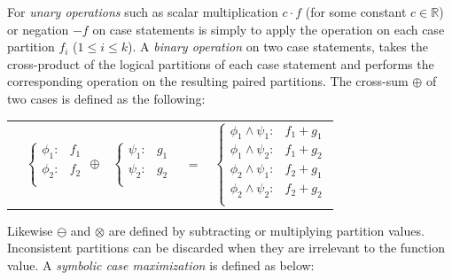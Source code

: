 \documentclass{article} %
\begin{document}
For \emph{unary operations} such as scalar multiplication $c\cdot f$ (for some constant $c \in \mathbb{R}$) or negation $-f$ on case statements is simply to apply the operation on each case partition $f_i$ ($1 \leq i \leq k$). 
A \emph{binary operation} on two case statements, takes the cross-product of the logical partitions of each case statement and performs the corresponding operation on the resulting paired partitions.  The cross-sum $\oplus$ of two cases is defined as the following:
{\footnotesize 
\vspace{-4mm}
\begin{center}
\begin{tabular}{r c c c l}
&
\hspace{-6mm} 
  $\begin{cases}
    \phi_1: & f_1 \\ 
    \phi_2: & f_2 \\ 
  \end{cases}$
$\oplus$
&
\hspace{-4mm}
  $\begin{cases}
    \psi_1: & g_1 \\ 
    \psi_2: & g_2 \\ 
  \end{cases}$
&
\hspace{-2mm} 
$ = $
&
\hspace{-2mm}
  $\begin{cases}
  \phi_1 \wedge \psi_1: & f_1 + g_1 \\ 
  \phi_1 \wedge \psi_2: & f_1 + g_2 \\ 
  \phi_2 \wedge \psi_1: & f_2 + g_1 \\ 
  \phi_2 \wedge \psi_2: & f_2 + g_2 \\ 
  \end{cases}$
\end{tabular}
\end{center}
\vspace{-2mm}
}
Likewise $\ominus$ and $\otimes$ are defined by subtracting or multiplying partition values.  Inconsistent partitions can be discarded when they are irrelevant to the function value.
A \emph{symbolic case maximization} is defined as below:
\vspace{-4mm}
\end{document}
